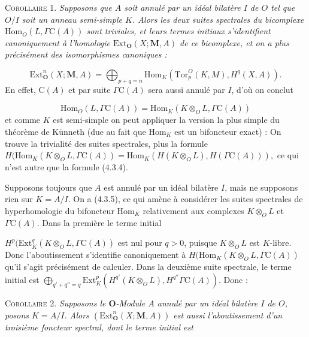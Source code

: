 \clearpage
{}

\textsc{Corollaire 1.} \textit{Supposons que $A$ soit annulé par un
idéal bilatère $I$ de $O$ tel que $O/I$ soit un anneau semi-simple $K$. Alors
les deux suites spectrales du bicomplexe $\mathrm{Hom}_O(L,\Gamma \mathrm C(A))$ sont
triviales, et leurs termes initiaux s'identifient canoniquement à l'homologie
$\mathrm{Ext}_{\mathbf O}(X;\mathbf M,A)$ de ce bicomplexe, et on a plus
précisément des isomorphismes canoniques :}

\[
\tag{4.3.4}
\mathrm{Ext}_{\mathbf O}^n(X;\mathbf M,A)=
\bigoplus_{p+q=n}
\mathrm{Hom}_K(\mathrm{Tor}_p^O(K,M),H^q(X,A)).
\]
En effet, $\mathrm C(A)$ et par suite $\Gamma \mathrm C(A)$ sera aussi annulé par $I$, d'où on
conclut

\[
\tag{4.3.5}
\mathrm{Hom}_O(L,\Gamma \mathrm C(A))=
\mathrm{Hom}_K(K\otimes_O L,\Gamma \mathrm C(A))
\]
et comme $K$ est semi-simple on peut appliquer la version la plus simple du
théorème de Künneth (due au fait que $\mathrm{Hom}_K$ est un bifoncteur exact) :
On trouve la trivialité des suites spectrales, plus la formule
$H(\mathrm{Hom}_K(K\otimes_O L,\Gamma \mathrm C(A))=
\mathrm{Hom}_K(H(K\otimes_O L),H(\Gamma \mathrm C(A))),$
ce qui n'est autre que la formule (4.3.4).

Supposons toujours que $A$ est annulé par un idéal bilatère $I$, mais ne
supposons rien sur $K=A/I$. On a (4.3.5), ce qui amène à considérer les suites
spectrales de hyperhomologie du bifoncteur $\mathrm{Hom}_K$ relativement aux
complexes $K\otimes_O L$ et $\Gamma \mathrm C(A)$. Dans la première le terme initial

$H^p(\mathrm{Ext}_K^q(K\otimes_O L,\Gamma \mathrm C(A))$ est nul pour $q>0$, puisque
$K\otimes_O L$ est $K$-libre. Donc l'aboutissement s'identifie canoniquement à
$H(\mathrm{Hom}_K(K\otimes_O L,\Gamma \mathrm C(A))$ qu'il s'agit précisément de
calculer. Dans la deuxième suite spectrale, le terme initial est
$\displaystyle \bigoplus_{q'+q''=q}
\mathrm{Ext}_K^p(H^{q'}(K\otimes_O L),H^{q''}\Gamma \mathrm C(A)).$
Donc :

\textsc{Corollaire 2.} \textit{Supposons le $\mathbf O$-Module $A$
annulé par un idéal bilatère $I$ de $O$, posons $K=A/I$. Alors
$(\mathrm{Ext}_{\mathbf O}^n(X;\mathbf M,A))$ est aussi l'aboutissement d'un
troisième foncteur spectral, dont le terme initial est}

